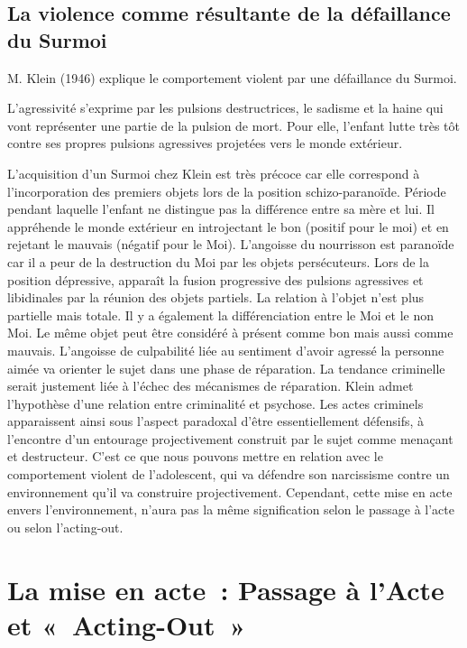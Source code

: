 \documentclass[12pt, a4paper]{book}
\begin{document}
\begin{spacing}{1.5}
\subsection{La violence comme résultante de la défaillance du Surmoi}

M. Klein (1946) explique le comportement violent par une défaillance du Surmoi.

L'agressivité s'exprime par les pulsions destructrices, le sadisme et la haine qui vont représenter une partie de la pulsion de mort. Pour elle, l'enfant lutte très tôt contre ses propres pulsions agressives projetées vers le monde extérieur.

L'acquisition d'un Surmoi chez Klein est très précoce car elle correspond à l'incorporation des premiers objets lors de la position schizo-paranoïde. Période pendant laquelle l'enfant ne distingue pas la différence entre sa mère et lui. Il appréhende le monde extérieur en introjectant le bon (positif pour le moi) et en rejetant le mauvais (négatif pour le Moi). L'angoisse du nourrisson est paranoïde car il a peur de la destruction du Moi par les objets persécuteurs. Lors de la position dépressive, apparaît la fusion progressive des pulsions agressives et libidinales par la réunion des objets partiels. La relation à l'objet n'est plus partielle mais totale. Il y a également la différenciation entre le Moi et le non Moi. Le même objet peut être considéré à présent comme bon mais aussi comme mauvais. L'angoisse de culpabilité liée au sentiment d'avoir agressé la personne aimée va orienter le sujet dans une phase de réparation. La tendance criminelle serait justement liée à l'échec des mécanismes de réparation. Klein admet l'hypothèse d'une relation entre criminalité et psychose. Les actes criminels apparaissent ainsi sous l'aspect paradoxal d'être essentiellement défensifs, à l'encontre d'un entourage projectivement construit par le sujet comme menaçant et destructeur. C'est ce que nous pouvons mettre en relation avec le comportement violent de l'adolescent, qui va défendre son narcissisme contre un environnement qu'il va construire projectivement. Cependant, cette mise en acte envers l'environnement, n'aura pas la même signification selon le passage à l'acte ou selon l'acting-out.

\section{La mise en acte : Passage à l'Acte et « Acting-Out »}


\end{spacing}
\end{document}
